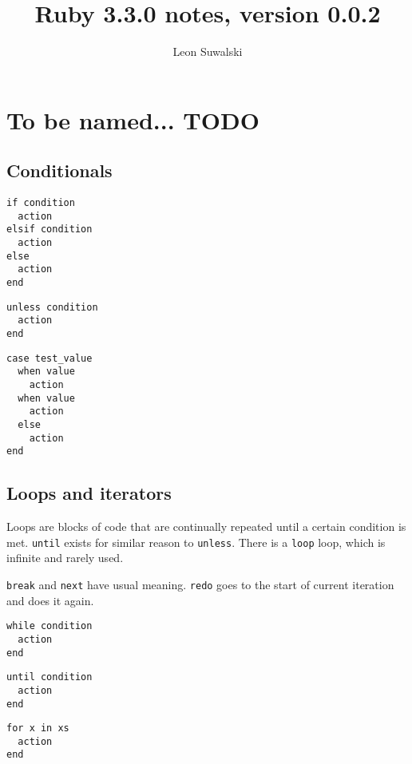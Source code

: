 \documentclass{a5charun}
\title{Ruby 3.3.0 notes, version 0.0.2}
\author{Leon Suwalski}
\begin{document}
\maketitle
\section{To be named... TODO}
\subsection{Conditionals}

\begin{multicols}{3}
\begin{verbatim}
if condition
  action
elsif condition
  action
else
  action
end
\end{verbatim}
\columnbreak

\begin{verbatim}
unless condition
  action
end
\end{verbatim}
\columnbreak

\begin{verbatim}
case test_value
  when value
    action
  when value
    action
  else
    action
end
\end{verbatim}
\end{multicols}

\subsection{Loops and iterators}
Loops are blocks of code that are continually repeated until a certain condition is met.
\texttt{until} exists for similar reason to \texttt{unless}.
There is a \texttt{loop} loop, which is infinite and rarely used.

\texttt{break} and \texttt{next} have usual meaning.
\texttt{redo} goes to the start of current iteration and does it again.

\begin{multicols}{3}
\begin{verbatim}
while condition
  action
end
\end{verbatim}
\columnbreak

\begin{verbatim}
until condition
  action
end
\end{verbatim}
\columnbreak

\begin{verbatim}
for x in xs
  action
end
\end{verbatim}
\end{multicols}
\end{document}
